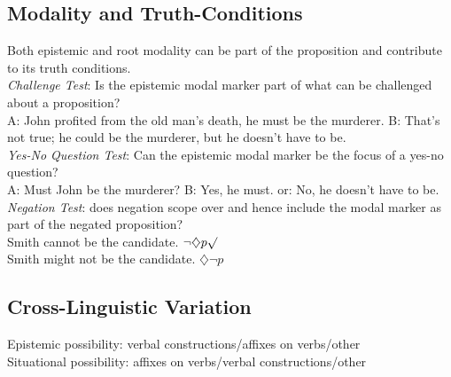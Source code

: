 \subsection*{Modality and Truth-Conditions}
Both epistemic and root modality can be part of the proposition and contribute to its truth conditions.\\
\emph{Challenge Test}: Is the epistemic modal marker part of what can be challenged about a proposition?\\
A: John profited from the old man’s death, he must
be the murderer.
B: That’s not true; he could be the murderer, but he
doesn’t have to be.\\
\emph{Yes-No Question Test}: Can the epistemic modal marker be the focus of a yes-no question?\\
A: Must John be the murderer?
B: Yes, he must. or: No, he doesn’t have to be.\\
\emph{Negation Test}: does negation scope over and hence include
the modal marker as part of the negated proposition?\\
Smith cannot be the candidate. $\neg \diamondsuit p \surd$\\
Smith might not be the candidate. $\diamondsuit \neg p$
\subsection{Cross-Linguistic Variation}
Epistemic possibility: verbal constructions/affixes on verbs/other\\
Situational possibility: affixes on verbs/verbal constructions/other